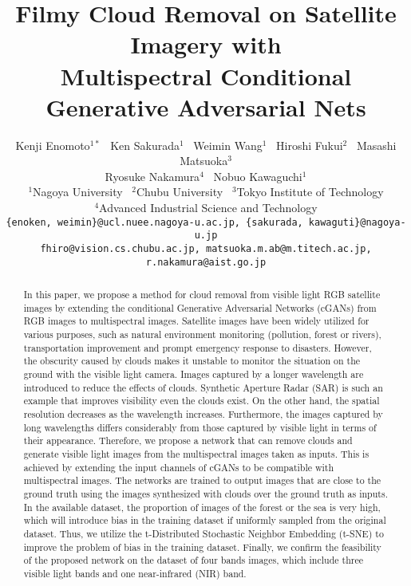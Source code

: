 \documentclass[10pt,twocolumn,letterpaper]{article}
\begin{document}
\title{Filmy Cloud Removal on Satellite Imagery with\\ Multispectral Conditional Generative Adversarial Nets}

\author{Kenji Enomoto$^{1*}$ \ Ken Sakurada$^{1}$ \ Weimin Wang$^{1}$ \ Hiroshi Fukui$^{2}$ \ Masashi Matsuoka$^{3}$\\ Ryosuke Nakamura$^{4}$ \ Nobuo Kawaguchi$^{1}$\\
$^1$Nagoya University \ $^2$Chubu University \ $^3$Tokyo Institute of Technology\\ $^4$Advanced Industrial Science and Technology\\
{\tt\small \{enoken, weimin\}@ucl.nuee.nagoya-u.ac.jp, \{sakurada, kawaguti\}@nagoya-u.jp}\\ {\tt\small fhiro@vision.cs.chubu.ac.jp, matsuoka.m.ab@m.titech.ac.jp, r.nakamura@aist.go.jp}
}




\maketitle


\begin{abstract}
In this paper, we propose a method for cloud removal from visible light RGB satellite images by extending the conditional Generative Adversarial Networks (cGANs) from RGB images to multispectral images. Satellite images have been widely utilized for various purposes, such as natural environment monitoring (pollution, forest or rivers), transportation improvement and prompt emergency response to disasters. However, the obscurity caused by clouds makes it unstable to monitor the situation on the ground with the visible light camera. Images captured by a longer wavelength are introduced to reduce the effects of clouds. Synthetic Aperture Radar (SAR) is such an example that improves visibility even the clouds exist. On the other hand, the spatial resolution decreases as the wavelength increases. Furthermore, the images captured by long wavelengths differs considerably from those captured by visible light in terms of their appearance. Therefore, we propose a network that can remove clouds and generate visible light images from the multispectral images taken as inputs. This is achieved by extending the input channels of cGANs to be compatible with multispectral images. The networks are trained to output images that are close to the ground truth using the images synthesized with clouds over the ground truth as inputs. In the available dataset, the proportion of images of the forest or the sea is very high, which will introduce bias in the training dataset if uniformly sampled from the original dataset. Thus, we utilize the t-Distributed Stochastic Neighbor Embedding (t-SNE) to improve the problem of bias in the training dataset. Finally, we confirm the feasibility of the proposed network on the dataset of four bands images, which include three visible light bands and one near-infrared (NIR) band.
\end{abstract}
\end{document}
